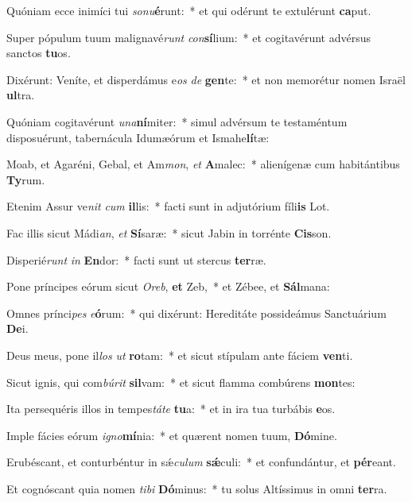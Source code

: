 \item Quóniam ecce inimíci tui \textit{so}\textit{nu}\textbf{é}runt:~* et qui odérunt te extulérunt \textbf{ca}put.
\item Super pópulum tuum malignavé\textit{runt} \textit{con}\textbf{sí}lium:~* et cogitavérunt advérsus sanctos \textbf{tu}os.
\item Dixérunt: Veníte, et disperdámus e\textit{os} \textit{de} \textbf{gen}te:~* et non memorétur nomen Israël \textbf{ul}tra.
\item Quóniam cogitavérunt \textit{u}\textit{na}\textbf{ní}miter:~* simul advérsum te testaméntum disposuérunt, tabernácula Idumæórum et Ismahe\textbf{lí}tæ:
\item Moab, et Agaréni, Gebal, et Am\textit{mon}, \textit{et} \textbf{A}malec:~* alienígenæ cum habitántibus \textbf{Ty}rum.
\item Etenim Assur ve\textit{nit} \textit{cum} \textbf{il}lis:~* facti sunt in adjutórium fíli\textbf{is} Lot.
\item Fac illis sicut Mádi\textit{an}, \textit{et} \textbf{Sí}saræ:~* sicut Jabin in torrénte \textbf{Cis}son.
\item Disperié\textit{runt} \textit{in} \textbf{En}dor:~* facti sunt ut stercus \textbf{ter}ræ.
\item Pone príncipes eórum sicut \textit{O}\textit{reb}, \textbf{et} Zeb,~* et Zébee, et \textbf{Sál}mana:
\item Omnes prínci\textit{pes} \textit{e}\textbf{ó}rum:~* qui dixérunt: Hereditáte possideámus Sanctuárium \textbf{De}i.
\item Deus meus, pone il\textit{los} \textit{ut} \textbf{ro}tam:~* et sicut stípulam ante fáciem \textbf{ven}ti.
\item Sicut ignis, qui com\textit{bú}\textit{rit} \textbf{sil}vam:~* et sicut flamma combúrens \textbf{mon}tes:
\item Ita persequéris illos in tempes\textit{tá}\textit{te} \textbf{tu}a:~* et in ira tua turbábis \textbf{e}os.
\item Imple fácies eórum \textit{i}\textit{gno}\textbf{mí}nia:~* et quærent nomen tuum, \textbf{Dó}mine.
\item Erubéscant, et conturbéntur in sǽ\textit{cu}\textit{lum} \textbf{sǽ}culi:~* et confundántur, et \textbf{pér}eant.
\item Et cognóscant quia nomen \textit{ti}\textit{bi} \textbf{Dó}minus:~* tu solus Altíssimus in omni \textbf{ter}ra.
